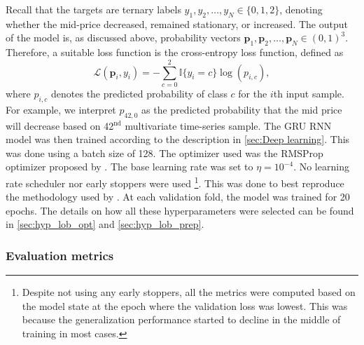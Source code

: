\documentclass{statsmsc}
\begin{document}
{Recall that the targets are ternary labels $y_1,y_2,\dots,y_N \in \{0,1,2\}$, denoting whether the mid-price
decreased, remained stationary, or increased. The output of the model is, as discussed above,
probability vectors $\mathbf{p}_1, \mathbf{p}_2,\dots, \mathbf{p}_N \in
(0,1)^3$. Therefore, a suitable loss function is the cross-entropy loss
function, defined as
\begin{equation}
    \mathcal{L}(\mathbf{p}_i, y_i)=-\sum^{2}_{c=0} \mathbb{I}\{y_i=c\} \log \left( p_{i,c} \right),
\end{equation}
where $p_{i,c}$ denotes the predicted probability of class $c$ for the $i$th input sample.
For example, we interpret $p_{42,0}$ as the predicted probability that the mid price will decrease
based on 42$^{\textrm{nd}}$ multivariate time-series sample.
The \ac{GRU} \ac{RNN} model was then trained according to the description in
\cref{sec:Deep learning}. This was done using a batch size of 128. The optimizer used
was the RMSProp optimizer proposed by \cite{rmsprop}. The base learning rate was set to
$\eta=10^{-4}$. No learning rate scheduler nor early stoppers were used%
\footnote{%
    Despite not using any early stoppers,
    all the metrics were computed based on the model state at the epoch where the validation loss
    was lowest. This was because
    the generalization performance started to decline in the middle of training in most cases.
}.
This was done to best reproduce the methodology used by \cite{dain}.
At each validation fold, the model was trained for 20
epochs. The details on how all these hyperparameters were selected can be found in
\cref{sec:hyp_lob_opt} and \cref{sec:hyp_lob_prep}.

\subsubsection{Evaluation metrics}%
\label{ssub:Evaluation metrics}

}
\end{document}
